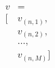 \documentclass[preview]{standalone}
\begin{document}
\begin{align*}
v &=\\ [ &v_{(n,1)},\\ &v_{(n,2)},\\ &\ldots ,\\ &v_{(n,M)}]
\end{align*}
\end{document}
